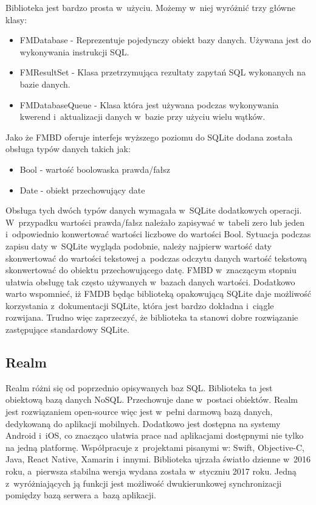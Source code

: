 Biblioteka jest bardzo prosta w~użyciu. Możemy w~niej wyróżnić trzy główne klasy: 

\begin{itemize}
	\item  FMDatabase - Reprezentuje pojedynczy obiekt bazy danych. Używana jest do wykonywania instrukcji SQL. 
	\item FMResultSet - Klasa przetrzymująca rezultaty zapytań SQL wykonanych na bazie danych.
	\item FMDatabaseQueue - Klasa która jest używana podczas wykonywania kwerend i~aktualizacji danych w~bazie przy użyciu wielu wątków.
\end{itemize}

Jako że FMBD oferuje interfejs wyższego poziomu do SQLite dodana została obsługa typów danych takich jak: 

\begin{itemize}
	\item Bool -  wartość boolowaska prawda/fałsz 
	\item Date - obiekt przechowujący date
\end{itemize}

Obsługa tych dwóch typów danych wymagała w~SQLite dodatkowych operacji. W~przypadku wartości prawda/fałsz należało zapisywać w~tabeli zero lub jeden i~odpowiednio konwertować wartości liczbowe do wartości Bool. Sytuacja podczas zapisu daty w~SQLite wygląda podobnie, należy najpierw wartość daty skonwertować do wartości tekstowej a~podczas odczytu danych wartość tekstową skonwertować do obiektu przechowującego datę. FMBD w~znaczącym stopniu ułatwia obsługę tak często używanych w~bazach danych wartości. Dodatkowo warto wspomnieć, iż FMDB będąc biblioteką opakowującą SQLite daje możliwość korzystania z~dokumentacji SQLite, która jest bardzo dokładna i~ciągle rozwijana. Trudno więc zaprzeczyć, że biblioteka ta stanowi dobre rozwiązanie zastępujące standardowy SQLite. 

\subsection{Realm}

Realm różni się od poprzednio opisywanych baz SQL. Biblioteka ta jest obiektową bazą danych NoSQL. Przechowuje dane w~postaci obiektów. Realm jest rozwiązaniem open-source więc jest w~pełni darmową bazą danych, dedykowaną do aplikacji mobilnych. Dodatkowo jest dostępna na systemy Android i~iOS, co znacząco ułatwia prace nad aplikacjami dostępnymi nie tylko na jedną platformę. Współpracuje z~projektami pisanymi w: Swift, Objective-C, Java, React Native, Xamarin i~innymi. Biblioteka ujrzała światło dzienne w~2016 roku, a~pierwsza stabilna wersja wydana została w~styczniu 2017 roku. Jedną z~wyróżniających ją funkcji jest możliwość dwukierunkowej synchronizacji pomiędzy bazą serwera a~bazą aplikacji.\par 


